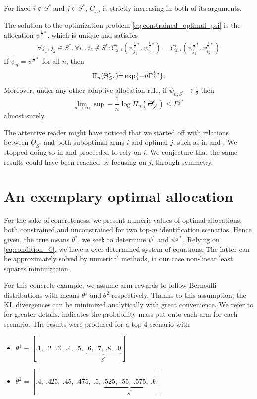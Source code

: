 \begin{lemma}\label{lemma:C_strictly_increasing}
  For fixed $i \notin S^*$ and $j \in S^*$, $C_{j, i}$ is strictly increasing
  in both of its arguments.
\end{lemma}

\begin{proposition}\label{proposition:characterization}
  The solution to the optimization problem \ref{eq:constrained_optimal_psi} is
  the allocation $\psi^{\frac{1}{2}*}$, which is unique and satisfies
  \begin{align}
    \forall j_1, j_2 \in S^*, \forall i_1, i_2 \notin S^*:
    C_{j, i}(\psi^{\frac{1}{2}*}_{j_1}, \psi^{\frac{1}{2}*}_{i_1})
    = C_{j, i}(\psi^{\frac{1}{2}*}_{j_2}, \psi^{\frac{1}{2}*}_{i_2})
    \label{eq:condition_C}
  \end{align}
  If $\psi_n = \psi^{\frac{1}{2}*}$ for all $n$, then
  \[\Pi_n(\Theta_{S^*}^c) \dot{=} \exp \{-n\Gamma^{\frac{1}{2}*}\}.\]
  Moreover, under any other adaptive allocation rule, if $\bar{\psi}_{n, S^*}
  \rightarrow \frac{1}{2}$ then
  \[\lim_{n \rightarrow \infty} \sup - \frac{1}{n} \log \Pi_n(\Theta^c_{S^*})
      \leq \Gamma^{\frac{1}{2}*}\]
  almost surely.
\end{proposition}

The attentive reader might have noticed that we started off with relations
between $\Theta_{S^*}$ and both suboptimal arms $i$ and optimal $j$, such as in
 and . We stopped doing
so in  and proceeded to rely on $i$. We conjecture  that the
same results could have been reached by focusing on $j$, through symmetry.

\section{An exemplary optimal allocation}
    \label{section:concrete_optimal_allocation}
For the sake of concreteness, we present numeric values of optimal allocations,
both constrained and unconstrained for two top-$m$ identification scenarios.
Hence given, the true means $\theta^*$, we seek to determine $\psi^*$ and
$\psi^{\frac{1}{2}*}$. Relying on \eqref{eq:condition_C}, we have a
over-determined system of equations. The latter can be approximately solved by
numerical methods, in our case non-linear least squares minimization.

For this concrete example, we assume arm rewards to follow Bernoulli
distributions with means $\theta^1$ and $\theta^2$ respectively. Thanks to this
assumption, the KL divergences can be minimized analytically with great
convenience. We refer to  for greater details.
 indicates the probability mass put onto each arm
for each scenario. The results were produced for a top-4 scenario with
\begin{itemize}
  \item $\theta^1 = [.1,\ .2,\ .3,\ .4,\ .5,\ \underbrace{.6,\ .7,\ .8,\
      .9}_\text{$S^*$}]$
  \item $\theta^2 = [.4,\ .425,\ .45,\ .475,\ .5,\ \underbrace{.525,\ .55,\
      .575,\ .6}_\text{$S^*$}]$
\end{itemize}

